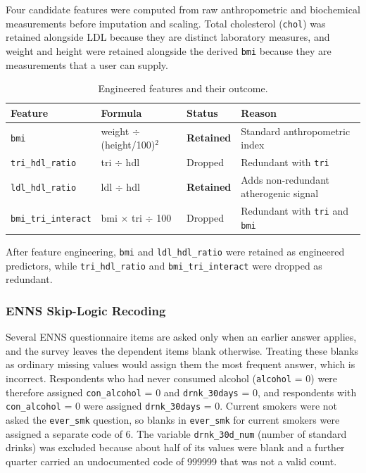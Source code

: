 Four candidate features were computed from raw anthropometric and biochemical measurements before imputation and scaling. Total cholesterol (\texttt{chol}) was retained alongside LDL because they are distinct laboratory measures, and weight and height were retained alongside the derived \texttt{bmi} because they are measurements that a user can supply.

\begin{table}[H]
\centering
\caption{Engineered features and their outcome.}
\label{tab:engineered_features}
\begin{tabular}{p{3cm}p{3.2cm}p{1.8cm}p{4cm}}
\hline
\textbf{Feature} & \textbf{Formula} & \textbf{Status} & \textbf{Reason} \\
\hline
\texttt{bmi} & weight $\div$ (height/100)$^2$ & \textbf{Retained} & Standard anthropometric index \\
\texttt{tri\_hdl\_ratio} & tri $\div$ hdl & Dropped & Redundant with \texttt{tri} \\
\texttt{ldl\_hdl\_ratio} & ldl $\div$ hdl & \textbf{Retained} & Adds non-redundant atherogenic signal \\
\texttt{bmi\_tri\_interact} & bmi $\times$ tri $\div$ 100 & Dropped & Redundant with \texttt{tri} and \texttt{bmi} \\
\hline
\end{tabular}
\end{table}

After feature engineering, \texttt{bmi} and \texttt{ldl\_hdl\_ratio} were retained as engineered predictors, while \texttt{tri\_hdl\_ratio} and \texttt{bmi\_tri\_interact} were dropped as redundant.

\subsubsection{ENNS Skip-Logic Recoding}

Several ENNS questionnaire items are asked only when an earlier answer applies, and the survey leaves the dependent items blank otherwise. Treating these blanks as ordinary missing values would assign them the most frequent answer, which is incorrect. Respondents who had never consumed alcohol (\texttt{alcohol} = 0) were therefore assigned \texttt{con\_alcohol} = 0 and \texttt{drnk\_30days} = 0, and respondents with \texttt{con\_alcohol} = 0 were assigned \texttt{drnk\_30days} = 0. Current smokers were not asked the \texttt{ever\_smk} question, so blanks in \texttt{ever\_smk} for current smokers were assigned a separate code of 6. The variable \texttt{drnk\_30d\_num} (number of standard drinks) was excluded because about half of its values were blank and a further quarter carried an undocumented code of 999999 that was not a valid count.

